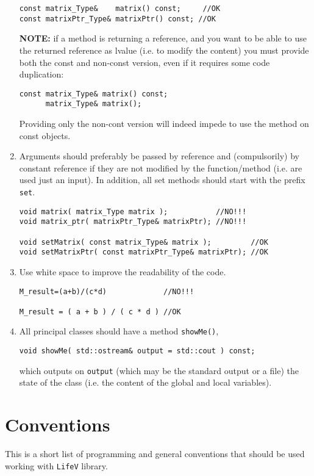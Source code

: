 \documentclass[10p]{article}
\begin{document}
\begin{enumerate}
\begin{lstlisting}
const matrix_Type&    matrix() const;     //OK
const matrixPtr_Type& matrixPtr() const; //OK
\end{lstlisting}
\textbf{NOTE:} if a method is returning a reference, and you want to be able to use the returned reference as lvalue (i.e. to modify the content) you must provide both the const and non-const version, even if it requires some code duplication:
\begin{lstlisting}
const matrix_Type& matrix() const;
      matrix_Type& matrix();
\end{lstlisting}
Providing only the non-cont version will indeed impede to use the method on const objects.
  \item Arguments should preferably be passed by reference and (compulsorily) by constant reference if they are not modified by the function/method
(i.e. are used just an input). In addition, all set methods should start with the prefix \texttt{set}.
\begin{lstlisting}
void matrix( matrix_Type matrix );           //NO!!!
void matrix_ptr( matrixPtr_Type& matrixPtr); //NO!!!

void setMatrix( const matrix_Type& matrix );         //OK
void setMatrixPtr( const matrixPtr_Type& matrixPtr); //OK
\end{lstlisting}
  \item Use white space to improve the readability of the code. 
\begin{lstlisting}
M_result=(a+b)/(c*d)             //NO!!!

M_result = ( a + b ) / ( c * d ) //OK
\end{lstlisting}
  \item All principal classes should have a method \texttt{showMe()},
\begin{lstlisting}
void showMe( std::ostream& output = std::cout ) const;
\end{lstlisting}
  which outputs on \texttt{output} (which may be the standard output or a file) the state of the class (i.e.  the content of the global and local variables).
\end{enumerate}

\section{Conventions}
This is a short list of programming and general conventions that should be used working with \texttt{LifeV} library.
\end{document}

